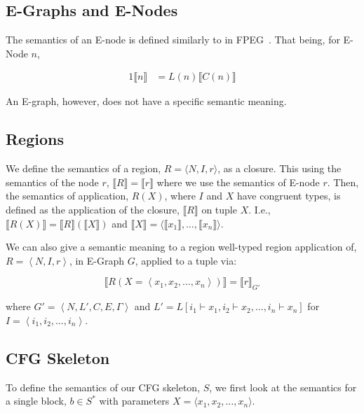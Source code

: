 \documentclass{article}
\begin{document}
\subsection{E-Graphs and E-Nodes}

The semantics of an E-node is defined similarly to in FPEG~\cite{dellaneve_2023}. That being, for E-Node $n$,

\begin{alignat*}{1}
  \llbracket n \rrbracket &= L(n) \llbracket C(n) \rrbracket
\end{alignat*}


An E-graph, however, does not have a specific semantic meaning.


\subsection{Regions}

We define the semantics of a region, $R = \langle N, I, r \rangle$, as a closure. This using the semantics of the node $r$, $\llbracket R \rrbracket = \llbracket r \rrbracket$ where we use the semantics of E-node $r$. Then, the semantics of application, $R (X)$, where $I$ and $X$ have congruent types, is defined as the application of the closure, $\llbracket R \rrbracket$ on tuple $X$. I.e., $\llbracket R (X) \rrbracket = \llbracket R \rrbracket \left( \llbracket X \rrbracket \right)$ and $\llbracket X \rrbracket = \langle \llbracket x_1 \rrbracket, \dots, \llbracket x_n \rrbracket \rangle$.

We can also give a semantic meaning to a region well-typed region application of, $R = \left\langle N, I, r \right\rangle$, in E-Graph $G$, applied to a tuple via:

$$
  \llbracket R \left( X = \left\langle x_1, x_2, \dots , x_n \right\rangle \right) \rrbracket = \llbracket r \rrbracket_{G'}
$$

where $G' = \left\langle N, L', C, E, \Gamma \right\rangle$ and $L' = L[i_1 \vdash x_1, i_2 \vdash x_2, \dots, i_n \vdash x_n]$ for $I= \left\langle i_1, i_2, \dots, i_n \right\rangle$.


\subsection{CFG Skeleton}

To define the semantics of our CFG skeleton, $S$, we first look at the semantics for a single block, $b \in S^*$ with parameters $X = \langle x_1, x_2, \dots, x_{n}\rangle$.
\end{document}
